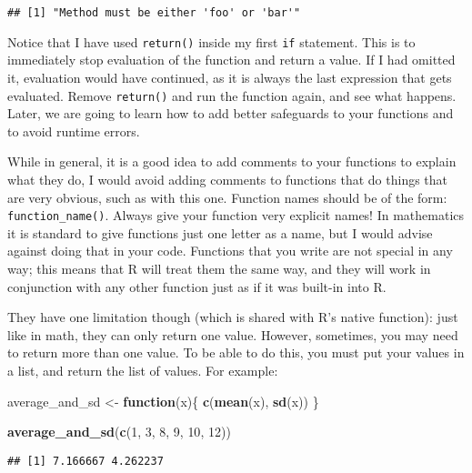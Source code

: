 \documentclass[
]{article}
\newenvironment{Shaded}{\begin{snugshade}}{\end{snugshade}}
\newcommand{\ControlFlowTok}[1]{\textcolor[rgb]{0.13,0.29,0.53}{\textbf{#1}}}
\newcommand{\DecValTok}[1]{\textcolor[rgb]{0.00,0.00,0.81}{#1}}
\newcommand{\KeywordTok}[1]{\textcolor[rgb]{0.13,0.29,0.53}{\textbf{#1}}}
\newcommand{\NormalTok}[1]{#1}
\newcommand{\StringTok}[1]{\textcolor[rgb]{0.31,0.60,0.02}{#1}}
\begin{document}
\begin{verbatim}
## [1] "Method must be either 'foo' or 'bar'"
\end{verbatim}

Notice that I have used \texttt{return()} inside my first \texttt{if} statement. This is to immediately stop
evaluation of the function and return a value. If I had omitted it, evaluation would have
continued, as it is always the last expression that gets evaluated. Remove \texttt{return()} and run the
function again, and see what happens. Later, we are going to learn how to add better safeguards to
your functions and to avoid runtime errors.

While in general, it is a good idea to add comments to your functions to explain what they do, I
would avoid adding comments to functions that do things that are very obvious, such as with this
one. Function names should be of the form: \texttt{function\_name()}. Always give your function very
explicit names! In mathematics it is standard to give functions just one letter as a name, but I
would advise against doing that in your code. Functions that you write are not special in any way;
this means that R will treat them the same way, and they will work in conjunction with any other
function just as if it was built-in into R.

They have one limitation though (which is shared with R's native function): just like in math,
they can only return one value. However, sometimes, you may need to return more than one value.
To be able to do this, you must put your values in a list, and return the list of values. For example:

\begin{Shaded}
\begin{Highlighting}[]
\NormalTok{average\_and\_sd \textless{}{-}}\StringTok{ }\ControlFlowTok{function}\NormalTok{(x)\{}
\KeywordTok{c}\NormalTok{(}\KeywordTok{mean}\NormalTok{(x), }\KeywordTok{sd}\NormalTok{(x))}
\NormalTok{\}}

\KeywordTok{average\_and\_sd}\NormalTok{(}\KeywordTok{c}\NormalTok{(}\DecValTok{1}\NormalTok{, }\DecValTok{3}\NormalTok{, }\DecValTok{8}\NormalTok{, }\DecValTok{9}\NormalTok{, }\DecValTok{10}\NormalTok{, }\DecValTok{12}\NormalTok{))}
\end{Highlighting}
\end{Shaded}

\begin{verbatim}
## [1] 7.166667 4.262237
\end{verbatim}
\end{document}
